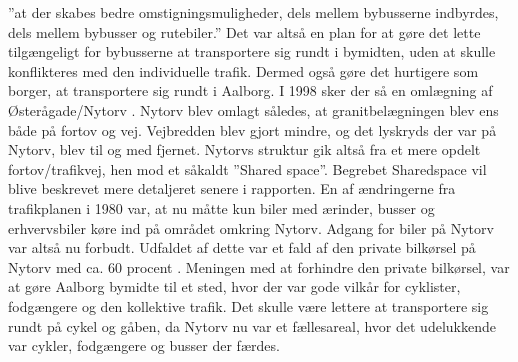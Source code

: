 ”at der skabes bedre omstigningsmuligheder, dels mellem bybusserne     indbyrdes, dels mellem bybusser og rutebiler.”
Det var altså en plan for at gøre det lette tilgængeligt for bybusserne at transportere sig rundt i bymidten, uden at skulle konflikteres med den individuelle trafik. Dermed også gøre det hurtigere som borger, at transportere sig rundt i Aalborg.
I 1998 sker der så en omlægning af Østerågade/Nytorv \autocite{omlaegning}.
Nytorv blev omlagt således, at granitbelægningen blev ens både på fortov og vej. Vejbredden blev gjort mindre, og det lyskryds der var på Nytorv, blev til og med fjernet. Nytorvs struktur gik altså fra et mere opdelt fortov/trafikvej, hen mod et såkaldt ”Shared space”. Begrebet Sharedspace vil blive beskrevet mere detaljeret senere i rapporten. En af ændringerne fra trafikplanen i 1980 var, at nu måtte kun biler med ærinder, busser og erhvervsbiler køre ind på området omkring Nytorv. Adgang for biler på Nytorv var altså nu forbudt. Udfaldet af dette var et fald af den private bilkørsel på Nytorv med ca. 60 procent \autocite{omlaegning}.
Meningen med at forhindre den private bilkørsel, var at gøre Aalborg bymidte til et sted, hvor der var gode vilkår for cyklister, fodgængere og den kollektive trafik. Det skulle være lettere at transportere sig rundt på cykel og gåben, da Nytorv nu var et fællesareal, hvor det udelukkende var cykler, fodgængere og busser der færdes.
